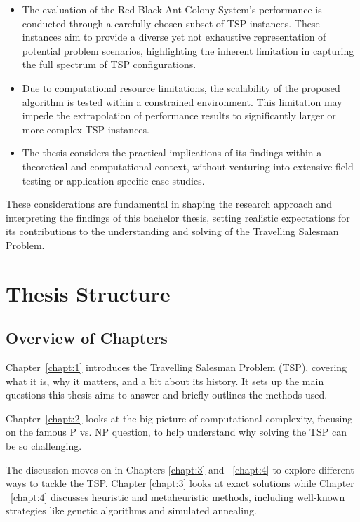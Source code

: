 \begin{itemize}
	\item The evaluation of the Red-Black Ant Colony System's performance is conducted through a carefully chosen subset of TSP instances. These instances aim to provide a diverse yet not exhaustive representation of potential problem scenarios, highlighting the inherent limitation in capturing the full spectrum of TSP configurations.
	\item Due to computational resource limitations, the scalability of the proposed algorithm is tested within a constrained environment. This limitation may impede the extrapolation of performance results to significantly larger or more complex TSP instances.
	\item The thesis considers the practical implications of its findings within a theoretical and computational context, without venturing into extensive field testing or application-specific case studies.
\end{itemize}

These considerations are fundamental in shaping the research approach and interpreting the findings of this bachelor thesis, setting realistic expectations for its contributions to the understanding and solving of the Travelling Salesman Problem.

\section{Thesis Structure}

\subsection{Overview of Chapters}

Chapter~\ref{chapt:1} introduces the Travelling Salesman Problem (TSP), covering what it is, why it matters, and a bit about its history. It sets up the main questions this thesis aims to answer and briefly outlines the methods used.

Chapter~\ref{chapt:2} looks at the big picture of computational complexity, focusing on the famous P vs. NP question, to help understand why solving the TSP can be so challenging.

The discussion moves on in Chapters \ref{chapt:3} and ~\ref{chapt:4} to explore different ways to tackle the TSP. Chapter \ref{chapt:3} looks at exact solutions while Chapter ~\ref{chapt:4} discusses heuristic and metaheuristic methods, including well-known strategies like genetic algorithms and simulated annealing.


